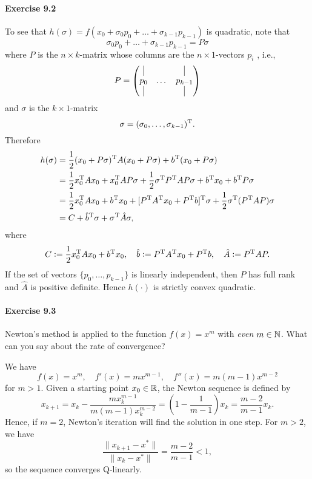\paragraph{Exercise 9.2}  %
To see that $h(\sigma) = f (x_0 + \sigma_0 p_0 +\dots+ \sigma_{k−1} p_{k−1})$ is quadratic, note that
\[
\sigma_0 p_0 + \dots + \sigma_{k−1} p_{k−1} = P\sigma
\]
where $P$ is the $n \times k$-matrix whose columns are the $n\times 1$-vectors $p_i$ , i.e.,
\[
P =
\begin{pmatrix}
\vline & & \vline\\
p_0 & \dots & p_{k-1}\\
\vline & & \vline
\end{pmatrix}
\]
and $\sigma$ is the $k \times 1$-matrix
\[
\sigma = (\sigma_0,\dots,\sigma_{k-1})^{\text{\upshape T}}.
\]
Therefore
\[
\begin{split}
h(\sigma)
&= \frac{1}{2}(x_0 + P\sigma)^{\text{\upshape T}} A (x_0+P\sigma) + b^{\text{\upshape T}} (x_0 + P\sigma)\\
&= \frac{1}{2} x_0^{\text{\upshape T}} A x_0 + x_0^{\text{\upshape T}} A P \sigma + \frac{1}{2}\sigma^{\text{\upshape T}} P^{\text{\upshape T}} AP\sigma + b^{\text{\upshape T}} x_0 + b^{\text{\upshape T}} P\sigma\\
&= \frac{1}{2} x_0^{\text{\upshape T}} A x_0 + b^{\text{\upshape T}} x_0 + [P^{\text{\upshape T}} A^{\text{\upshape T}} x_0 + P^{\text{\upshape T}} b]^{\text{\upshape T}}\sigma + \frac{1}{2}\sigma^{\text{\upshape T}} (P^{\text{\upshape T}} A P)\sigma\\
&= C + \hat{b}^{\text{\upshape T}} \sigma + \sigma^{\text{\upshape T}} \hat{A}\sigma,
\end{split}
\]
where
\[
C \mathrel{\mathop:}=\frac{1}{2} x_0^{\text{\upshape T}} A x_0 + b^{\text{\upshape T}} x_0,
\quad
\hat{b}\mathrel{\mathop:}= P^{\text{\upshape T}} A^{\text{\upshape T}} x_0 + P^{\text{\upshape T}} b,
\quad
\hat{A} \mathrel{\mathop:}= P^{\text{\upshape T}} A P.
\]
If the set of vectors $\{p_0,\dots, p_{k-1}\}$ is linearly independent, then
$P$ has full rank and $\hat{A}$ is positive definite. Hence $h(\cdot)$ is
strictly convex quadratic.


\paragraph{Exercise 9.3}
Newton's method is applied to the function $f(x)=x^m$ with \emph{even}
$m\in\mathbb{N}$. What can you say about the rate of convergence?

We have
\[
f(x) = x^m, \quad f'(x)=mx^{m-1}, \quad f''(x)=m(m-1) x^{m-2}
\]
for $m>1$.
Given a starting point $x_0\in\mathbb{R}$, the Newton sequence is defined by
\[
x_{k+1}
= x_k - \frac{m x_k^{m-1}}{m(m-1)x_k^{m-2}}
= \left(1 - \frac{1}{m-1}\right) x_k
= \frac{m-2}{m-1} x_k.
\]
Hence, if $m=2$, Newton's iteration will find the solution in one step. For $m>2$, we have
\[
\frac{\|x_{k+1}-x^*\|}{\|x_k - x^*\|}
= \frac{m-2}{m-1}
< 1,
\]
so the sequence converges Q-linearly.

